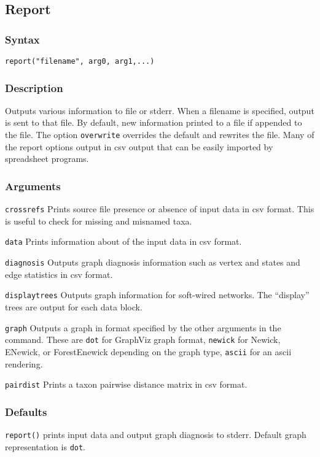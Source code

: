 \documentclass[11pt]{article}
\begin{document}
	\subsection{Report}
		\subsubsection{Syntax}
				\texttt{report("filename", arg0, arg1,...)}
		\subsubsection{Description}
			Outputs various information to file or stderr.  When a filename is specified, output is sent to that file.  By default, new information printed to a file
			if appended to the file.  The option \texttt{overwrite} overrides the default and rewrites the file.  Many of the report options output in csv output that
			can be easily imported by spreadsheet programs.
		\subsubsection{Arguments}
				\noindent \texttt{crossrefs} Prints source file presence or absence of input data in csv format.  This is useful to check for 
				missing and misnamed taxa.
			
			
				\smallskip
				\noindent \texttt{data} Prints information about of the input data in csv format.
				
				\smallskip
				\noindent \texttt{diagnosis}  Outputs graph diagnosis information such as vertex and states and edge statistics in csv format. 
			
				\smallskip
				\noindent \texttt{displaytrees}  Outputs graph information for soft-wired networks.  The ``display'' trees are output for each data block. 
				
				\smallskip
				\noindent \texttt{graph} Outputs a graph in format specified by the other arguments in the command.  These are \texttt{dot} for GraphViz graph format,
				\texttt{newick} for Newick, ENewick, or ForestEnewick depending on the graph type, \texttt{ascii} for an ascii rendering.  
				
				\smallskip
				\noindent \texttt{pairdist} Prints a taxon pairwise distance matrix in csv format.   
				
		\subsubsection{Defaults}
				\texttt{report()} prints input data and output graph diagnosis  to stderr.  Default graph representation is \texttt{dot}.
\end{document}
